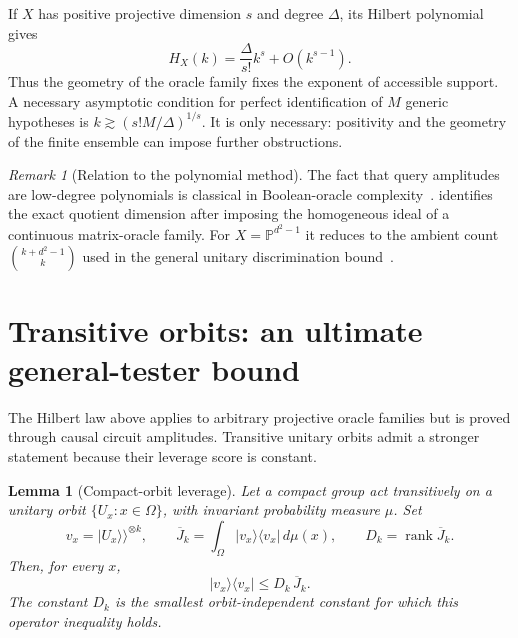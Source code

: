 \documentclass[11pt]{article}
\newtheorem{lemma}[theorem]{Lemma}
\theoremstyle{definition}
\theoremstyle{remark}
\newtheorem{remark}[theorem]{Remark}
\newcommand{\PP}{\mathbb P}
\newcommand{\rank}{\operatorname{rank}}
\newcommand{\ket}[1]{\lvert #1\rangle}
\newcommand{\bra}[1]{\langle #1\rvert}
\newcommand{\vket}[1]{\lvert #1\rangle\!\rangle}
\begin{document}
If $X$ has positive projective dimension $s$ and degree $\Delta$, its Hilbert
polynomial gives
\begin{equation}\label{eq:hilbertasymptotic}
 H_X(k)=\frac{\Delta}{s!}k^s+O(k^{s-1}).
\end{equation}
Thus the geometry of the oracle family fixes the exponent of accessible
support.  A necessary asymptotic condition for perfect identification of $M$
generic hypotheses is
$k\gtrsim(s!M/\Delta)^{1/s}$.  It is only necessary: positivity and the
geometry of the finite ensemble can impose further obstructions.

\begin{remark}[Relation to the polynomial method]
The fact that query amplitudes are low-degree polynomials is classical in
Boolean-oracle complexity~\cite{beals2001}.   identifies the
exact quotient dimension after imposing the homogeneous ideal of a continuous
matrix-oracle family.  For $X=\PP^{d^2-1}$ it reduces to the ambient count
$\binom{k+d^2-1}{k}$ used in the general unitary discrimination
bound~\cite{bavaresco2022}.
\end{remark}

\section{Transitive orbits: an ultimate general-tester bound}

The Hilbert law above applies to arbitrary projective oracle families but is
proved through causal circuit amplitudes.  Transitive unitary orbits admit a
stronger statement because their leverage score is constant.

\begin{lemma}[Compact-orbit leverage]\label{lem:leverage}
Let a compact group act transitively on a unitary orbit $\{U_x:x\in\Omega\}$,
with invariant probability measure $\mu$.  Set
\begin{equation}
 v_x=\vket{U_x}^{\otimes k},\qquad
 \overline J_k=\int_\Omega \ket{v_x}\bra{v_x}\,d\mu(x),\qquad
 D_k=\rank\overline J_k.
\end{equation}
Then, for every $x$,
\begin{equation}\label{eq:rankonedomination}
 \ket{v_x}\bra{v_x}\leq D_k\,\overline J_k.
\end{equation}
The constant $D_k$ is the smallest orbit-independent constant for which this
operator inequality holds.
\end{lemma}
\end{document}

